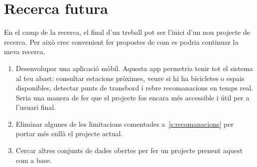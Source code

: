 \section{Recerca futura}

En el camp de la recerca, el final d'un treball pot ser l'inici d'un nou projecte de recerca. Per això crec convenient fer propostes de com es podria continuar la meva recerca.

\begin{enumerate}
 \item Desenvolupar una aplicació mòbil. Aquesta app permetria tenir tot el sistema al teu abast: consultar estacions pròximes, veure si hi ha bicicletes o espais disponibles, detectar punts de transbord i rebre recomanacions en temps real. Seria una manera de fer que el projecte fos encara més accessible i útil per a l’usuari final.
 \item Eliminar algunes de les limitacions comentades a~\ref{s:recomanacions} per portar més enllà el projecte actual.
 \item Cercar altres conjunts de dades obertes per fer un projecte prenent aquest com a base.
\end{enumerate}



\label{c:conclusions}
